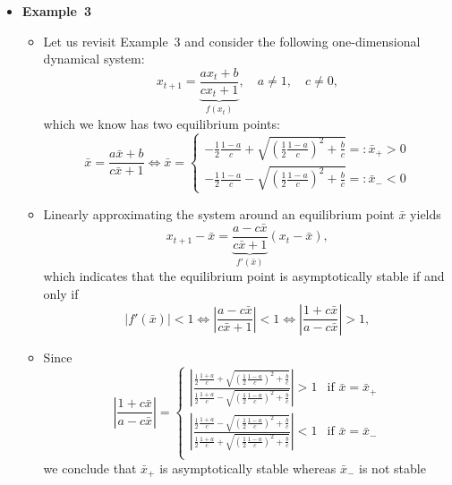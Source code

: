 \documentclass[12pt,a4paper]{article}
\begin{document}
\begin{itemize}
\clearpage
\item \textbf{Example~3}
  \begin{itemize}
  \item Let us revisit Example~3 and consider the following one-dimensional dynamical system:
    \begin{equation}\nonumber%
      x_{t+1} = \underbrace{\frac{ax_{t}+b}{cx_{t}+1}}_{f(x_{t})},
      \quad a \neq 1, \quad c\neq 0,
    \end{equation}
    which we know has two equilibrium points:
    \begin{equation}\nonumber%
      \bar{x} = \frac{a\bar{x}+b}{c\bar{x}+1}
      \iff
      \bar{x} =
      \begin{cases}
        - \frac{1}{2}\frac{1-a}{c} + \sqrt{\left(\frac{1}{2}\frac{1-a}{c}\right)^{2} + \frac{b}{c}} =:\bar{x}_{+} > 0  \\
        - \frac{1}{2}\frac{1-a}{c} - \sqrt{\left(\frac{1}{2}\frac{1-a}{c}\right)^{2} + \frac{b}{c}} =:\bar{x}_{-} < 0
      \end{cases}
    \end{equation}
  \item Linearly approximating the system around an equilibrium point $\bar{x}$ yields
    \begin{equation}\nonumber%
      x_{t+1} - \bar{x} =
      \underbrace{
        \frac{a-c\bar{x}}{c\bar{x}+1}
        }_{f'(\bar{x})}
        (x_{t}-\bar{x}),
      \end{equation}
      which indicates that the equilibrium point is asymptotically stable if and only if
      \begin{equation}\nonumber%
        \left|f'(\bar{x})\right| < 1
        \iff
        \left|\frac{a-c\bar{x}}{c\bar{x}+1}\right| < 1
        \iff
        \left|\frac{1+c\bar{x}}{a-c\bar{x}}\right| > 1,
      \end{equation}
    \item Since
      \begin{equation}\nonumber%
        \left|\frac{1+c\bar{x}}{a-c\bar{x}}\right|
        =
        \begin{cases}
          \left|\frac{\frac{1}{2}\frac{1+a}{c} + \sqrt{\left(\frac{1}{2}\frac{1-a}{c}\right)^{2} +
          \frac{b}{c}}}{\frac{1}{2}\frac{1+a}{c} - \sqrt{\left(\frac{1}{2}\frac{1-a}{c}\right)^{2} +
          \frac{b}{c}}}\right| > 1 & \text{if $\bar{x}=\bar{x}_{+}$}\\[15pt] 
          \left|\frac{\frac{1}{2}\frac{1+a}{c} - \sqrt{\left(\frac{1}{2}\frac{1-a}{c}\right)^{2} +
          \frac{b}{c}}}{\frac{1}{2}\frac{1+a}{c} + \sqrt{\left(\frac{1}{2}\frac{1-a}{c}\right)^{2} +
          \frac{b}{c}}}\right| < 1 & \text{if $\bar{x}=\bar{x}_{-}$}\\
        \end{cases}
      \end{equation}
      we conclude that
      $\bar{x}_{+}$ is asymptotically stable
      whereas
      $\bar{x}_{-}$ is not stable
      

\end{itemize}
\end{itemize}
\end{document}
